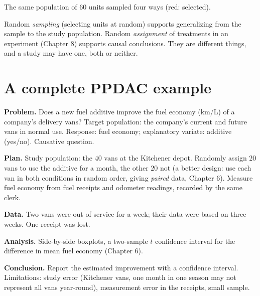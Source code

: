 \begin{center}
\end{center}
The same population of $60$ units sampled four ways (red: selected).

\begin{important}
Random \emph{sampling} (selecting units at random) supports generalizing from the
sample to the study population. Random \emph{assignment} of treatments in an experiment
(Chapter 8) supports causal conclusions. They are different things, and a study may have
one, both or neither.
\end{important}

\section{A complete PPDAC example}

\begin{example}
\textbf{Problem.} Does a new fuel additive improve the fuel economy (km/L) of a company's
delivery vans? Target population: the company's current and future vans in normal use.
Response: fuel economy; explanatory variate: additive (yes/no). Causative question.

\textbf{Plan.} Study population: the $40$ vans at the Kitchener depot. Randomly assign
$20$ vans to use the additive for a month, the other $20$ not (a better design: use each
van in both conditions in random order, giving \emph{paired} data, Chapter 6). Measure
fuel economy from fuel receipts and odometer readings, recorded by the same clerk.

\textbf{Data.} Two vans were out of service for a week; their data were based on three
weeks. One receipt was lost.

\textbf{Analysis.} Side-by-side boxplots, a two-sample $t$ confidence interval for the
difference in mean fuel economy (Chapter 6).

\textbf{Conclusion.} Report the estimated improvement with a confidence interval.
Limitations: study error (Kitchener vans, one month in one season may not represent all
vans year-round), measurement error in the receipts, small sample.
\end{example}

